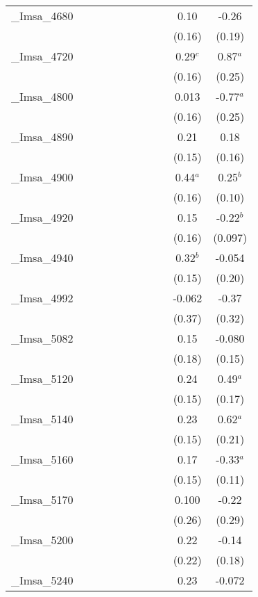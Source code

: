 \documentclass[]{article}
\begin{document}
\begin{tabular}{lcccccccccc}
\_Imsa\_4680 &  &  &  &  &  &  &  &  & 0.10 & -0.26 \\
 &  &  &  &  &  &  &  &  & (0.16) & (0.19) \\
\_Imsa\_4720 &  &  &  &  &  &  &  &  & 0.29$^c$ & 0.87$^a$ \\
 &  &  &  &  &  &  &  &  & (0.16) & (0.25) \\
\_Imsa\_4800 &  &  &  &  &  &  &  &  & 0.013 & -0.77$^a$ \\
 &  &  &  &  &  &  &  &  & (0.16) & (0.25) \\
\_Imsa\_4890 &  &  &  &  &  &  &  &  & 0.21 & 0.18 \\
 &  &  &  &  &  &  &  &  & (0.15) & (0.16) \\
\_Imsa\_4900 &  &  &  &  &  &  &  &  & 0.44$^a$ & 0.25$^b$ \\
 &  &  &  &  &  &  &  &  & (0.16) & (0.10) \\
\_Imsa\_4920 &  &  &  &  &  &  &  &  & 0.15 & -0.22$^b$ \\
 &  &  &  &  &  &  &  &  & (0.16) & (0.097) \\
\_Imsa\_4940 &  &  &  &  &  &  &  &  & 0.32$^b$ & -0.054 \\
 &  &  &  &  &  &  &  &  & (0.15) & (0.20) \\
\_Imsa\_4992 &  &  &  &  &  &  &  &  & -0.062 & -0.37 \\
 &  &  &  &  &  &  &  &  & (0.37) & (0.32) \\
\_Imsa\_5082 &  &  &  &  &  &  &  &  & 0.15 & -0.080 \\
 &  &  &  &  &  &  &  &  & (0.18) & (0.15) \\
\_Imsa\_5120 &  &  &  &  &  &  &  &  & 0.24 & 0.49$^a$ \\
 &  &  &  &  &  &  &  &  & (0.15) & (0.17) \\
\_Imsa\_5140 &  &  &  &  &  &  &  &  & 0.23 & 0.62$^a$ \\
 &  &  &  &  &  &  &  &  & (0.15) & (0.21) \\
\_Imsa\_5160 &  &  &  &  &  &  &  &  & 0.17 & -0.33$^a$ \\
 &  &  &  &  &  &  &  &  & (0.15) & (0.11) \\
\_Imsa\_5170 &  &  &  &  &  &  &  &  & 0.100 & -0.22 \\
 &  &  &  &  &  &  &  &  & (0.26) & (0.29) \\
\_Imsa\_5200 &  &  &  &  &  &  &  &  & 0.22 & -0.14 \\
 &  &  &  &  &  &  &  &  & (0.22) & (0.18) \\
\_Imsa\_5240 &  &  &  &  &  &  &  &  & 0.23 & -0.072 \\

\end{tabular}
\end{document}
